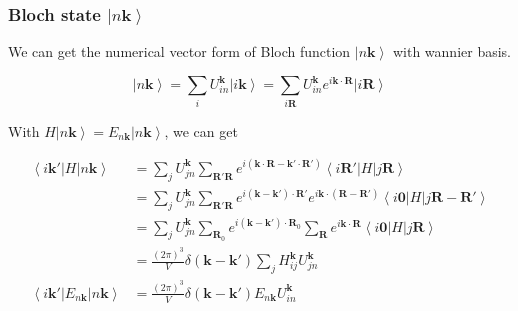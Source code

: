 \subsubsection{Bloch state $\left| n\boldsymbol{k} \right\rangle$}

We can get the numerical vector form of Bloch function $\left| n\boldsymbol{k} \right\rangle$ with wannier basis.

\begin{equation}
  \left| n \boldsymbol{k} \right\rangle 
    = \sum_{i} U_{in}^{\boldsymbol{k}} \left| i\boldsymbol{k} \right\rangle 
    = \sum_{i\boldsymbol{R}} U_{in}^{\boldsymbol{k}} e^{i\boldsymbol{k} \cdot \boldsymbol{R}} \left| i\boldsymbol{R} \right\rangle 
\end{equation}

\noindent
With $\hat{H} \left| n \boldsymbol{k} \right\rangle = E_{n \boldsymbol{k}} \left| n \boldsymbol{k} \right\rangle$, we can get

\begin{equation*}
  \begin{aligned}
    \left\langle i \boldsymbol{k}' \right| H \left| n \boldsymbol{k} \right\rangle 
      &= \sum_{j} U_{jn}^{\boldsymbol{k}} \sum_{\boldsymbol{R}'\boldsymbol{R}} 
        e^{i\left( \boldsymbol{k} \cdot \boldsymbol{R} - \boldsymbol{k}' \cdot \boldsymbol{R}' \right)} 
        \left\langle i \boldsymbol{R}' \right| H \left| j \boldsymbol{R} \right\rangle \\
      &= \sum_{j} U_{jn}^{\boldsymbol{k}} \sum_{\boldsymbol{R}'\boldsymbol{R}} 
        e^{i\left( \boldsymbol{k} - \boldsymbol{k}' \right) \cdot \boldsymbol{R}'} 
        e^{i\boldsymbol{k} \cdot \left( \boldsymbol{R} - \boldsymbol{R}' \right)} 
        \left\langle i \boldsymbol{0} \right| H \left| j \boldsymbol{R} - \boldsymbol{R}' \right\rangle \\
      &= \sum_{j} U_{jn}^{\boldsymbol{k}} \sum_{\boldsymbol{R}_0} e^{i\left( \boldsymbol{k} - \boldsymbol{k}' \right) \cdot \boldsymbol{R}_0} 
        \sum_{\boldsymbol{R}} e^{i\boldsymbol{k} \cdot \boldsymbol{R}} 
        \left\langle i \boldsymbol{0} \right| H \left| j \boldsymbol{R} \right\rangle \\
      &= \frac{(2\pi)^3}{V} \delta(\boldsymbol{k}-\boldsymbol{k}') \sum_{j} H_{ij}^{\boldsymbol{k}} U_{jn}^{\boldsymbol{k}} \\
    \left\langle i \boldsymbol{k}' \right| E_{n\boldsymbol{k}} \left| n \boldsymbol{k} \right\rangle 
      &= \frac{(2\pi)^3}{V} \delta(\boldsymbol{k}-\boldsymbol{k}') E_{n\boldsymbol{k}} U_{in}^{\boldsymbol{k}} 
  \end{aligned}
\end{equation*}

